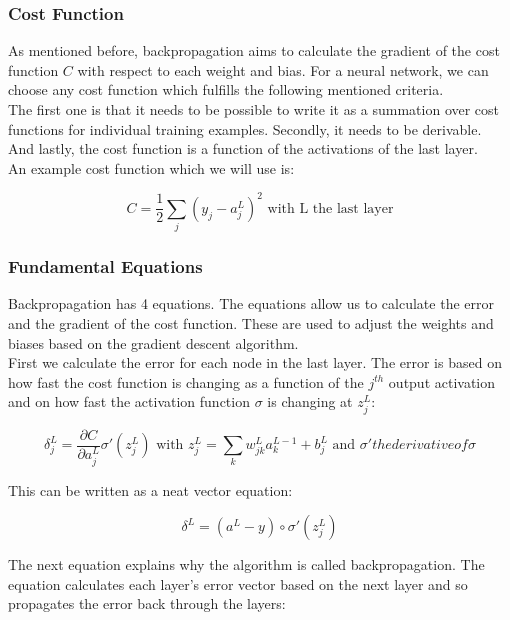 		\subsubsection{Cost Function}
		
As mentioned before, backpropagation aims to calculate the gradient of the cost function $C$ with respect to each weight and bias. For a neural network, we can choose any cost function which fulfills the following mentioned criteria. \\
The first one is that it needs to be possible to write it as a summation over cost functions for individual training examples. Secondly, it needs to be derivable. And lastly, the cost function is a function of the activations of the last layer. \\
An example cost function which we will use is:

\begin{equation} 
C = \frac{1}{2}\sum_j (y_j - a^L_j)^2 \text{ with L the last layer}
\end{equation}

		\subsubsection{Fundamental Equations}

Backpropagation has 4 equations. The equations allow us to calculate the error and the gradient of the cost function. These are used to adjust the weights and biases based on the gradient descent algorithm. \\

First we calculate the error for each node in the last layer. The error is based on how fast the cost function is changing as a function of the $j^{th}$ output activation and on how fast the activation function $\sigma$ is changing at $z_j^L$:

\begin{equation} 
\delta^L_j = \frac{\partial C}{\partial a^L_j} \sigma'(z_j^L)
\text{ with }
z_j^L = \sum_k w^L_{jk}a^{L-1}_k+b^L_j \text{ and } \sigma' the derivative of \sigma
\end{equation}

\noindent This can be written as a neat vector equation:

\begin{equation} 
\delta^L = (a^L-y) \circ \sigma'(z_j^L)
\end{equation}

\noindent The next equation explains why the algorithm is called backpropagation. The equation calculates each layer's error vector based on the next layer and so propagates the error back through the layers:


